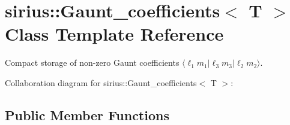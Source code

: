 \hypertarget{classsirius_1_1_gaunt__coefficients}{}\section{sirius\+:\+:Gaunt\+\_\+coefficients$<$ T $>$ Class Template Reference}
\label{classsirius_1_1_gaunt__coefficients}


Compact storage of non-\/zero Gaunt coefficients $ \langle \ell_1 m_1 | \ell_3 m_3 | \ell_2 m_2 \rangle $.  




Collaboration diagram for sirius\+:\+:Gaunt\+\_\+coefficients$<$ T $>$\+:
\subsection*{Public Member Functions}
